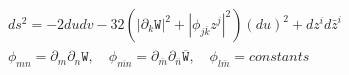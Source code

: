 \begin{equation}
\begin{array}{ll}
ds^2=-2dudv-32(|\partial_k \mathtt{W}|^2+|\phi_{j \bar k}z^j|^2)(du)^2+dz^id\bar{z}^i\\[3mm]
\phi_{mn}=\partial_m \partial_n \mathtt{W},\,\,\,\,\,\,\phi_{\overline{mn}}=\partial_{\bar m} \partial_{\bar n} \overline{\mathtt{W}},\,\,\,\,\,\, \phi_{l \bar m}=constants
\end{array}
\end{equation}

